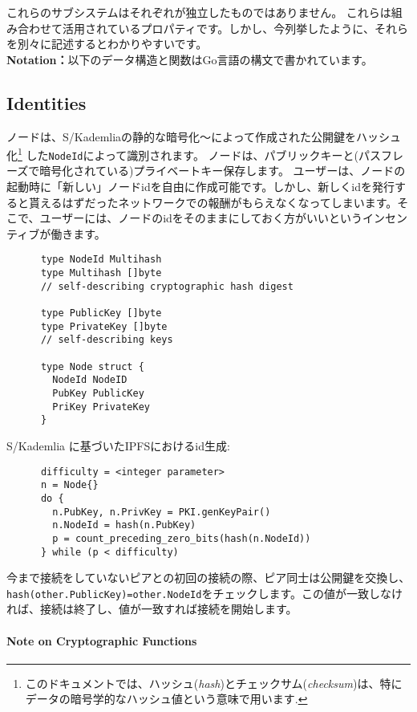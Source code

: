 \documentclass{sig-alternate}
\begin{document}
これらのサブシステムはそれぞれが独立したものではありません。 これらは組み合わせて活用されているプロパティです。しかし、今列挙したように、それらを別々に記述するとわかりやすいです。
\\

\textbf{Notation：}以下のデータ構造と関数はGo言語の構文で書かれています。
\subsection{Identities}
ノードは、S/Kademliaの静的な暗号化〜\cite{baumgart07}によって作成された公開鍵をハッシュ化\footnote{このドキュメントでは、ハッシュ(\textit{hash})とチェックサム(\textit{checksum})は、特にデータの暗号学的なハッシュ値という意味で用います.} した\texttt{NodeId}によって識別されます。 ノードは、パブリックキーと(パスフレーズで暗号化されている)プライベートキー保存します。 ユーザーは、ノードの起動時に「新しい」ノードidを自由に作成可能です。しかし、新しくidを発行すると貰えるはずだったネットワークでの報酬がもらえなくなってしまいます。そこで、ユーザーには、ノードのidをそのままにしておく方がいいというインセンティブが働きます。

\begin{verbatim}
      type NodeId Multihash
      type Multihash []byte
      // self-describing cryptographic hash digest

      type PublicKey []byte
      type PrivateKey []byte
      // self-describing keys

      type Node struct {
        NodeId NodeID
        PubKey PublicKey
        PriKey PrivateKey
      }
\end{verbatim}

S/Kademlia に基づいたIPFSにおけるid生成:

\begin{verbatim}
      difficulty = <integer parameter>
      n = Node{}
      do {
        n.PubKey, n.PrivKey = PKI.genKeyPair()
        n.NodeId = hash(n.PubKey)
        p = count_preceding_zero_bits(hash(n.NodeId))
      } while (p < difficulty)
\end{verbatim}

今まで接続をしていないピアとの初回の接続の際、ピア同士は公開鍵を交換し、\texttt{hash(other.PublicKey)=other.NodeId}をチェックします。この値が一致しなければ、接続は終了し、値が一致すれば接続を開始します。

\paragraph{Note on Cryptographic Functions}
\hspace{1cm}
\end{document}
